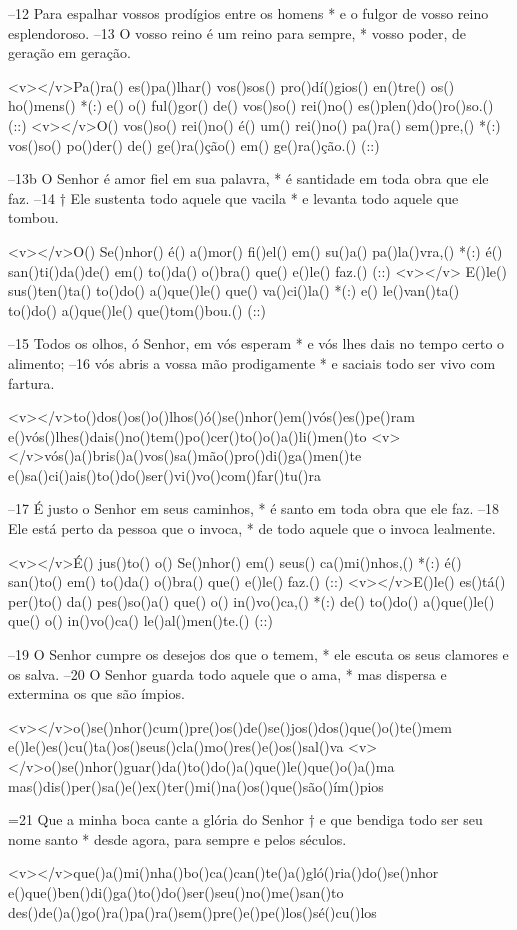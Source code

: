 –12 Para espalhar vossos prodígios entre os homens *
e o fulgor de vosso reino esplendoroso.
–13 O vosso reino é um reino para sempre, *
vosso poder, de geração em geração.

<v></v>Pa()ra() es()pa()lhar() vos()sos() pro()dí()gios() en()tre() os() ho()mens() *(:)
e() o() ful()gor() de() vos()so() rei()no() es()plen()do()ro()so.() (::)
<v></v>O() vos()so() rei()no() é() um() rei()no() pa()ra() sem()pre,() *(:)
vos()so() po()der() de() ge()ra()ção() em() ge()ra()ção.() (::)

–13b O Senhor é amor fiel em sua palavra, *
é santidade em toda obra que ele faz.
–14 † Ele sustenta todo aquele que vacila *
e levanta todo aquele que tombou.

<v></v>O() Se()nhor() é() a()mor() fi()el() em() su()a() pa()la()vra,() *(:)
é() san()ti()da()de() em() to()da() o()bra() que() e()le() faz.() (::)
<v></v> E()le() sus()ten()ta() to()do() a()que()le() que() va()ci()la() *(:)
e() le()van()ta() to()do() a()que()le() que()tom()bou.() (::)

–15 Todos os olhos, ó Senhor, em vós esperam *
e vós lhes dais no tempo certo o alimento;
–16 vós abris a vossa mão prodigamente *
e saciais todo ser vivo com fartura.

<v></v>to()dos()os()o()lhos()ó()se()nhor()em()vós()es()pe()ram
e()vós()lhes()dais()no()tem()po()cer()to()o()a()li()men()to
<v></v>vós()a()bris()a()vos()sa()mão()pro()di()ga()men()te
e()sa()ci()ais()to()do()ser()vi()vo()com()far()tu()ra

–17 É justo o Senhor em seus caminhos, *
é santo em toda obra que ele faz.
–18 Ele está perto da pessoa que o invoca, *
de todo aquele que o invoca lealmente.

<v></v>É() jus()to() o() Se()nhor() em() seus() ca()mi()nhos,() *(:)
é() san()to() em() to()da() o()bra() que() e()le() faz.() (::)
<v></v>E()le() es()tá() per()to() da() pes()so()a() que() o() in()vo()ca,() *(:)
de() to()do() a()que()le() que() o() in()vo()ca() le()al()men()te.() (::)

–19 O Senhor cumpre os desejos dos que o temem, *
ele escuta os seus clamores e os salva.
–20 O Senhor guarda todo aquele que o ama, *
mas dispersa e extermina os que são ímpios.

<v></v>o()se()nhor()cum()pre()os()de()se()jos()dos()que()o()te()mem
e()le()es()cu()ta()os()seus()cla()mo()res()e()os()sal()va
<v></v>o()se()nhor()guar()da()to()do()a()que()le()que()o()a()ma
mas()dis()per()sa()e()ex()ter()mi()na()os()que()são()ím()pios

=21 Que a minha boca cante a glória do Senhor †
e que bendiga todo ser seu nome santo *
desde agora, para sempre e pelos séculos.

<v></v>que()a()mi()nha()bo()ca()can()te()a()gló()ria()do()se()nhor
e()que()ben()di()ga()to()do()ser()seu()no()me()san()to
des()de()a()go()ra()pa()ra()sem()pre()e()pe()los()sé()cu()los